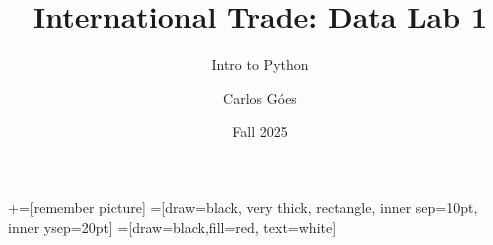 \documentclass[notes,11pt, aspectratio=169, xcolor=table]{beamer}
\title[]{International Trade: Data Lab 1}
\subtitle[]{Intro to Python}
\author[Góes]
{Carlos Góes\inst{1}}
\date{Fall 2025}
\institute[GWU]{\inst{1} George Washington University }
\begin{document}
\newcommand\marktopleft[1]{%
    \tikz[overlay,remember picture] 
        \node (marker-#1-a) at (-.3em,.3em) {};%
}
\newcommand\markbottomright[2]{%
    \tikz[overlay,remember picture] 
        \node (marker-#1-b) at (0em,0em) {};%
}
+=[remember picture] 
 =[draw=black, very thick, rectangle, inner sep=10pt, inner ysep=20pt]
 =[draw=black,fill=red, text=white]


















\end{document}
